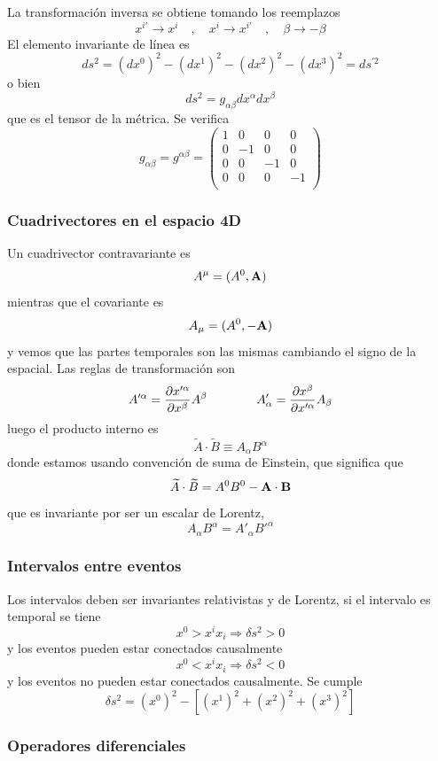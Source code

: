 \documentclass[10pt,oneside]{CBFT_book}
\begin{document}
La transformación inversa se obtiene tomando los reemplazos
\[
	x^{i'} \to x^i \quad ,\quad  x^i \to x^{i'} \quad ,\quad  \beta \to -\beta
\]
El elemento invariante de línea es 
\[
	ds^2 = (dx^0)^2 - (dx^1)^2 - (dx^2)^2 - (dx^3)^2 = ds^{'2}
\]
o bien 
\[
	ds^2 = g_{\alpha\beta}dx^{\alpha}dx^{\beta}
\]
que es el tensor de la métrica. Se verifica
\[
	g_{\alpha\beta} = g^{\alpha\beta} =
	\begin{pmatrix}
	 1 & 0 & 0 & 0 \\
	 0 & -1 & 0 & 0 \\
	 0 & 0 & -1 & 0 \\
	 0 & 0 & 0 & -1 \\
	\end{pmatrix}
\]

\subsubsection{Cuadrivectores en el espacio 4D}

Un cuadrivector contravariante es
\[
	A^{\mu} = ( A^0, \vb{A})
\]
mientras que el covariante es
\[
	A_{\mu} = ( A^0, -\vb{A})
\]
y vemos que las partes temporales son las mismas cambiando el signo de la espacial. Las reglas de 
transformación son
\[
	A'^{\alpha}= \frac{\partial^{\hspace{-0.05em}} {x'^{\alpha}}}{\partial {x^{\beta}}^{\hspace{-0.05em}}} A^{\beta} \qquad\qquad 
		A'_{\alpha}= \frac{\partial^{\hspace{-0.05em}} {x^{\beta}}}{\partial {x'^{\alpha}}^{\hspace{-0.05em}}} A_{\beta}
\]
luego el producto interno es
\[
	\widetilde{A}\cdot\widetilde{B} \equiv A_\alpha B^\alpha
\]
donde estamos usando convención de suma de Einstein, que significa que 
\[
	\widetilde{A}\cdot\widetilde{B} = A^0 B^0 -\pe{A}{B}
\]
que es invariante por ser un escalar de Lorentz,
\[
	A_\alpha B^\alpha = A'_\alpha B'^\alpha
\]

\subsubsection{Intervalos entre eventos}

Los intervalos deben ser invariantes relativistas y de Lorentz, si el intervalo es temporal se tiene 
\[
	x^0 > x^i x_i \Rightarrow \delta s^2 > 0  
\]
y los eventos pueden estar conectados causalmente
\[
	x^0 < x^i x_i \Rightarrow \delta s^2 < 0 
\]
y los eventos no pueden estar conectados causalmente. Se cumple
\[
	\delta s^2 = (x^0)^2 - [ (x^1)^2 + (x^2)^2 + (x^3)^2 ]
\]

\subsubsection{Operadores diferenciales}
\end{document}
